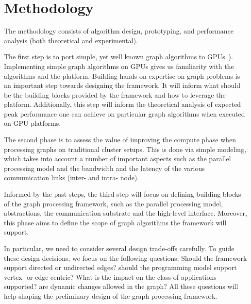 \section{Methodology}
\label{sec:methodology}
The methodology consists of algorithm design, prototyping, and performance analysis (both theoretical and experimental).


The first step is to port simple, yet well known graph algorithms to GPUs~\cite{Quinn1984,Meyer2003,Harish2007,Malewicz2009,Sungpack2010}). Implementing simple graph algorithms on GPUs gives us familiarity with the algorithms and the platform. Building hands-on expertise on graph problems is an important step towards designing the framework. It will inform what should be the building blocks provided by the framework and how to leverage the platform. Additionally, this step will inform the theoretical analysis of expected peak performance one can achieve on particular graph algorithms when executed on GPU platforms.

The second phase is to assess the value of improving the compute phase when processing graphs on traditional cluster setups. This is done via simple modeling, which takes into account a number of important aspects such as the parallel processing model and the bandwidth and the latency of the various communication links (inter- and intra- node).

Informed by the past steps, the third step will focus on defining building blocks of the graph processing framework, such as the parallel processing model, abstractions, the communication substrate and the high-level interface. Moreover, this phase aims to define the scope of graph algorithms the framework will support. 

In particular, we need to consider several design trade-offs carefully. To guide these design decisions, we focus on the following questions: Should the framework support directed or undirected edges? should the programming model support vertex- or edge-centric? What is the impact on the class of applications supported? are dynamic changes allowed in the graph? All these questions will help shaping the preliminary design of the graph processing framework.
